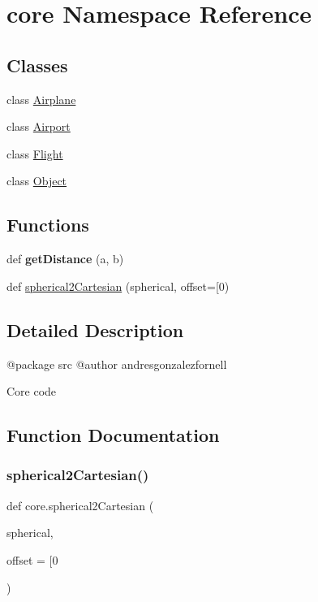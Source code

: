 \hypertarget{namespacecore}{}\section{core Namespace Reference}
\label{namespacecore}
\subsection*{Classes}
\begin{DoxyCompactItemize}
\item 
class \hyperlink{classcore_1_1_airplane}{Airplane}
\item 
class \hyperlink{classcore_1_1_airport}{Airport}
\item 
class \hyperlink{classcore_1_1_flight}{Flight}
\item 
class \hyperlink{classcore_1_1_object}{Object}
\end{DoxyCompactItemize}
\subsection*{Functions}
\begin{DoxyCompactItemize}
\item 
\mbox{\label{namespacecore_a7ddd9202950d4e81347414a30114902d}} 
def {\bfseries get\+Distance} (a, b)
\item 
def \hyperlink{namespacecore_ae7a98ce92107367589ea56be697f6482}{spherical2\+Cartesian} (spherical, offset=\mbox{[}0)
\end{DoxyCompactItemize}


\subsection{Detailed Description}
\begin{DoxyVerb}@package src
@author andresgonzalezfornell

Core code
\end{DoxyVerb}
 

\subsection{Function Documentation}
\mbox{\label{namespacecore_ae7a98ce92107367589ea56be697f6482}} 
\subsubsection{\texorpdfstring{spherical2\+Cartesian()}{spherical2Cartesian()}}
{\footnotesize\ttfamily def core.\+spherical2\+Cartesian (\begin{DoxyParamCaption}\item[{}]{spherical,  }\item[{}]{offset = {\ttfamily \mbox{[}0} }\end{DoxyParamCaption})}

